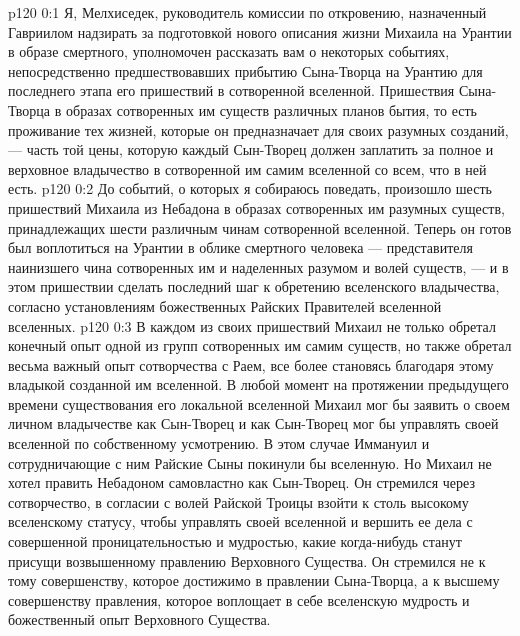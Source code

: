 \vs p120 0:1 Я, Мелхиседек, руководитель комиссии по откровению, назначенный Гавриилом надзирать за подготовкой нового описания жизни Михаила на Урантии в образе смертного, уполномочен рассказать вам о некоторых событиях, непосредственно предшествовавших прибытию Сына\hyp{}Творца на Урантию для последнего этапа его пришествий в сотворенной вселенной. Пришествия Сына\hyp{}Творца в образах сотворенных им существ различных планов бытия, то есть проживание тех жизней, которые он предназначает для своих разумных созданий, --- часть той цены, которую каждый Сын\hyp{}Творец должен заплатить за полное и верховное владычество в сотворенной им самим вселенной со всем, что в ней есть.
\vs p120 0:2 До событий, о которых я собираюсь поведать, произошло шесть пришествий Михаила из Небадона в образах сотворенных им разумных существ, принадлежащих шести различным чинам сотворенной вселенной. Теперь он готов был воплотиться на Урантии в облике смертного человека --- представителя наинизшего чина сотворенных им и наделенных разумом и волей существ, --- и в этом пришествии сделать последний шаг к обретению вселенского владычества, согласно установлениям божественных Райских Правителей вселенной вселенных.
\vs p120 0:3 В каждом из своих пришествий Михаил не только обретал конечный опыт одной из групп сотворенных им самим существ, но также обретал весьма важный опыт сотворчества с Раем, все более становясь благодаря этому владыкой созданной им вселенной. В любой момент на протяжении предыдущего времени существования его локальной вселенной Михаил мог бы заявить о своем личном владычестве как Сын\hyp{}Творец и как Сын\hyp{}Творец мог бы управлять своей вселенной по собственному усмотрению. В этом случае Иммануил и сотрудничающие с ним Райские Сыны покинули бы вселенную. Но Михаил не хотел править Небадоном самовластно как Сын\hyp{}Творец. Он стремился через сотворчество, в согласии с волей Райской Троицы взойти к столь высокому вселенскому статусу, чтобы управлять своей вселенной и вершить ее дела с совершенной проницательностью и мудростью, какие когда\hyp{}нибудь станут присущи возвышенному правлению Верховного Существа. Он стремился не к тому совершенству, которое достижимо в правлении Сына\hyp{}Творца, а к высшему совершенству правления, которое воплощает в себе вселенскую мудрость и божественный опыт Верховного Существа.
